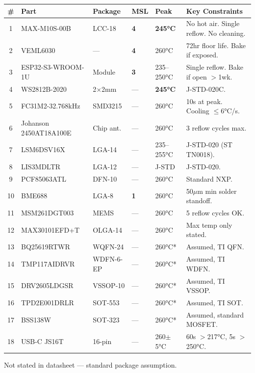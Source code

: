 \documentclass[11pt,a4paper]{article}
\begin{document}
{\small
\begin{table}[H]
\centering
\renewcommand{\arraystretch}{1.15}
\begin{tabular}{@{}clllll@{}}
\toprule
\textbf{\#} & \textbf{Part} & \textbf{Package} & \textbf{MSL} & \textbf{Peak} & \textbf{Key Constraints} \\
\midrule
\rowcolor{danger!8}
1 & MAX-M10S-00B & LCC-18 & \textbf{4} & \textbf{245°C} & No hot air. Single reflow. No cleaning. \\
\rowcolor{danger!8}
2 & VEML6030 & — & \textbf{4} & 260°C & 72hr floor life. Bake if exposed. \\
\rowcolor{warning!8}
3 & ESP32-S3-WROOM-1U & Module & \textbf{3} & 235--250°C & Single reflow. Bake if open $>$1wk. \\
\rowcolor{danger!8}
4 & WS2812B-2020 & 2$\times$2mm & — & \textbf{245°C} & J-STD-020C. \\
5 & FC31M2-32.768kHz & SMD3215 & — & 260°C & 10s at peak. Cooling $\leq$6°C/s. \\
6 & Johanson 2450AT18A100E & Chip ant. & — & 260°C & 3 reflow cycles max. \\
7 & LSM6DSV16X & LGA-14 & — & 235--255°C & J-STD-020 (ST TN0018). \\
8 & LIS3MDLTR & LGA-12 & — & J-STD & J-STD-020. \\
9 & PCF85063ATL & DFN-10 & — & 260°C & Standard NXP. \\
10 & BME688 & LGA-8 & \textbf{1} & 260°C & 50$\mu$m min solder standoff. \\
11 & MSM261DGT003 & MEMS & — & 260°C & 5 reflow cycles OK. \\
12 & MAX30101EFD+T & OLGA-14 & — & 260°C & Max temp only stated. \\
13 & BQ25619RTWR & WQFN-24 & — & 260°C* & Assumed, TI QFN. \\
14 & TMP117AIDRVR & WDFN-6-EP & — & 260°C* & Assumed, TI WDFN. \\
15 & DRV2605LDGSR & VSSOP-10 & — & 260°C* & Assumed, TI VSSOP. \\
16 & TPD2E001DRLR & SOT-553 & — & 260°C* & Assumed, TI SOT. \\
17 & BSS138W & SOT-323 & — & 260°C* & Assumed, standard MOSFET. \\
18 & USB-C JS16T & 16-pin & — & 260$\pm$5°C & 60s $>$217°C, 5s $>$250°C. \\
\bottomrule
\end{tabular}
\end{table}
}
{\footnotesize *Not stated in datasheet — standard package assumption.}
\end{document}
